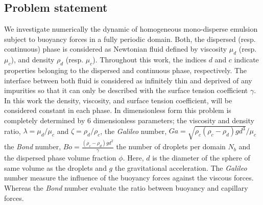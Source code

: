 

\subsection{Problem statement}
We investigate numerically the dynamic of homogeneous mono-disperse emulsion subject to buoyancy forces in a fully periodic domain. 
Both, the dispersed (resp. continuous) phase is considered as Newtonian fluid defined by viscosity $\mu_d$ (resp. $\mu_c$), and density $\rho_d$ (resp. $\mu_c$).
Throughout this work, the indices $d$ and $c$ indicate properties belonging to the dispersed and continuous phase, respectively. 
The interface between both fluid is considered as infinitely thin and deprived of any impurities so that it can only be described with the surface tension coefficient $\gamma$. 
In this work the density, viscosity, and surface tension coefficient, will be considered constant in each phase.
In dimensionless form this problem is completely determined by $6$ dimensionless parameters;  the viscosity and density ratio, $\lambda = \mu_d / \mu_c$ and $\zeta = \rho_d / \rho_c$,  
the \textit{Galileo} number, 
$
    Ga =\sqrt{\rho_c(\rho_c - \rho_d) g d^3} / \mu_c
$
the \textit{Bond} number, 
$
    Bo =\frac{(\rho_c - \rho_d) g d^2}{\gamma}
$
the number of droplets per domain $N_b$ and the dispersed phase volume fraction $\phi$. 
Here, $d$ is the diameter of the sphere of same volume as the droplets and $g$ the gravitational acceleration.
The \textit{Galileo} number measure the influence of the buoyancy forces against the viscous forces.
Whereas the \textit{Bond} number evaluate the ratio between buoyancy and capillary forces. 

